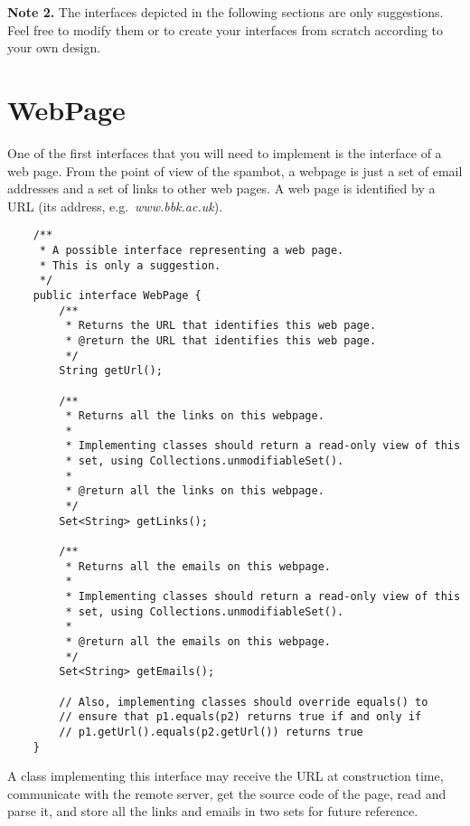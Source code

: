 \documentclass{article}
\begin{document}
\vspace{1em}

\textbf{Note 2.} The interfaces depicted in the following sections are
only suggestions. Feel free to modify them or to create your
interfaces from scratch according to your own design.

\vspace{1em}

\section{WebPage}
\label{sec:webpage}

One of the first interfaces that you will need to implement is the
interface of a web page. From the point of view of the spambot, a
webpage is just a set of email addresses and a set of links to other
web pages. A web page is identified by a URL (its address,
e.g.~\emph{www.bbk.ac.uk}). 

\begin{verbatim}
    /**
     * A possible interface representing a web page. 
     * This is only a suggestion.
     */
    public interface WebPage {
        /**
         * Returns the URL that identifies this web page. 
         * @return the URL that identifies this web page. 
         */
        String getUrl();

        /**
         * Returns all the links on this webpage.
         *
         * Implementing classes should return a read-only view of this 
         * set, using Collections.unmodifiableSet().
         *
         * @return all the links on this webpage.
         */
        Set<String> getLinks();

        /**
         * Returns all the emails on this webpage.
         *
         * Implementing classes should return a read-only view of this 
         * set, using Collections.unmodifiableSet().
         *
         * @return all the emails on this webpage.
         */
        Set<String> getEmails();

        // Also, implementing classes should override equals() to 
        // ensure that p1.equals(p2) returns true if and only if
        // p1.getUrl().equals(p2.getUrl()) returns true
    }
\end{verbatim}

A class implementing this interface may receive the URL at
construction time, communicate with the remote server, get the source
code of the page, read and parse it, and store all the links and
emails in two sets for future reference. 
\end{document}
